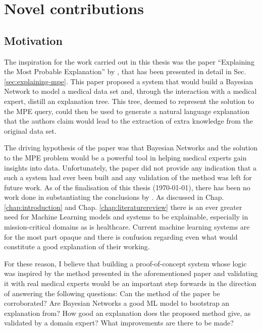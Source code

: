 \section{Novel contributions}\label{sec:novel-contributions}
 \subsection{Motivation} 
 The inspiration for the work carried out in this thesis was the paper \enquote{Explaining the Most Probable Explanation} by \cite{Butz2018}, that has been presented in detail in Sec. \ref{sec:explaining-mpe}.
 This paper proposed a system that would build a Bayesian Network to model a medical data set and, through the interaction with a medical expert, distill an explanation tree.
 This tree, deemed to represent the solution to the MPE query, could then be used to generate a natural language explanation that the authors claim would lead to the extraction of extra knowledge from the original data set.  

 The driving hypothesis of the paper was that Bayesian Networks and the solution to the MPE problem would be a powerful tool in helping medical experts gain insights into data.
 Unfortunately, the paper did not provide any indication that a such a system had ever been built and any validation of the method was left for future work.
 As of the finalisation of this thesis (\today), there has been no work done in substantiating the conclusions by \cite{Butz2018}. 
 As discussed in Chap. \ref{chap:introduction} and Chap. \ref{chap:literaturereview} there is an ever greater need for Machine Learning models and systems to be explainable, especially in mission-critical domains as is healthcare.
 Current machine learning systems are for the most part opaque and there is confusion regarding even what would constitute a good explanation of their working.
 
 For these reason, I believe that building a proof-of-concept system whose logic was inspired by the method presented in the aforementioned paper and validating it with real medical experts would be an important step forwards in the direction of answering the following questions:
 Can the method of the paper be corroborated?
 Are Bayesian Networks a good ML model to bootstrap an explanation from?
 How good an explanation does the proposed method give, as validated by a domain expert?
 What improvements are there to be made?
 

